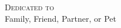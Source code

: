 %
%
%
%
%
\cleardoublepage
\thispagestyle{empty}
\hspace{0pt}\vfill

\begin{center}
    \textsc{Dedicated to}\\
    Family, Friend, Partner, or Pet
\end{center}

\vfill\hspace{0pt}
\cleardoublepage
